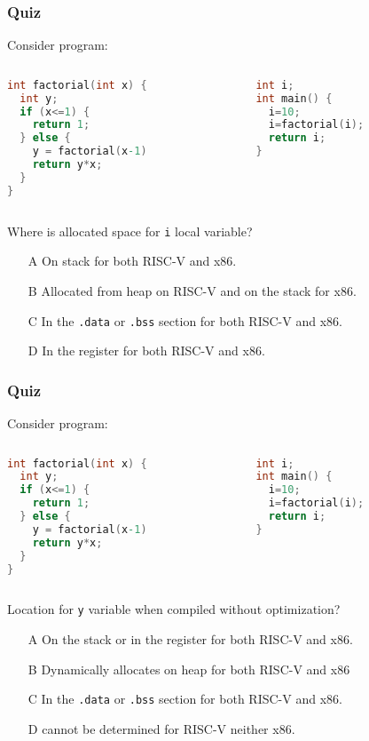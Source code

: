 \documentclass{beamer}
\begin{document}
\begin{frame}[fragile]
\frametitle{Quiz}

Consider program:
\begin{columns}
\begin{column}{0.45\textwidth}
\begin{lstlisting}[language={C},columns=flexible]
int factorial(int x) {
  int y;
  if (x<=1) {
    return 1;
  } else {
    y = factorial(x-1)
    return y*x;
  }
}
\end{lstlisting}
\end{column}
\hfill
\begin{column}{0.45\textwidth}  
\begin{lstlisting}[language={C},columns=flexible]
int i;
int main() {
  i=10;
  i=factorial(i);
  return i;
}
\end{lstlisting}
\end{column}
\end{columns}

Where is allocated space for \texttt{i} local variable?
\begin{itemize}
\item[A] On stack for both RISC-V and x86.
\item[B] Allocated from heap on RISC-V and on the stack for x86.
\item[C] In the \texttt{.data} or \texttt{.bss} section for both RISC-V and x86.
\item[D] In the register for both RISC-V and x86.
\end{itemize}
\end{frame}


\begin{frame}[fragile]
\frametitle{Quiz}

Consider program:
\begin{columns}
\begin{column}{0.45\textwidth}
\begin{lstlisting}[language={C},columns=flexible]
int factorial(int x) {
  int y;
  if (x<=1) {
    return 1;
  } else {
    y = factorial(x-1)
    return y*x;
  }
}
\end{lstlisting}
\end{column}
\hfill
\begin{column}{0.45\textwidth}  
\begin{lstlisting}[language={C},columns=flexible]
int i;
int main() {
  i=10;
  i=factorial(i);
  return i;
}
\end{lstlisting}
\end{column}
\end{columns}

Location for \texttt{y} variable when compiled without optimization?
\begin{itemize}
\item[A] On the stack or in the register for both RISC-V and x86.
\item[B] Dynamically allocates on heap for both RISC-V and x86
\item[C] In the \texttt{.data} or \texttt{.bss} section for both RISC-V and x86.
\item[D] cannot be determined for RISC-V neither x86.
\end{itemize}
\end{frame}
\end{document}
